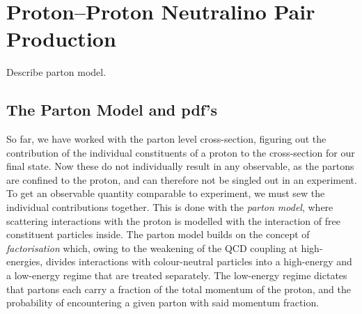 \documentclass[../main.tex]{subfiles}
\begin{document}
\chapter{Proton--Proton Neutralino Pair Production}

\begin{TODO}
  \item Describe parton model.
\end{TODO}

\section{The Parton Model and pdf's}
So far, we have worked with the parton level cross-section, figuring out the contribution of the individual constituents of a proton to the cross-section for our final state.
Now these do not individually result in any observable, as the partons are confined to the proton, and can therefore not be singled out in an experiment.
To get an observable quantity comparable to experiment, we must sew the individual contributions together.
This is done with the \emph{parton model}, where scattering interactions with the proton is modelled with the interaction of free constituent particles inside.
The parton model builds on the concept of \emph{factorisation} which, owing to the weakening of the QCD coupling at high-energies, divides interactions with colour-neutral particles into a high-energy and a low-energy regime that are treated separately.
The low-energy regime dictates that partons each carry a fraction of the total momentum of the proton, and the probability of encountering a given parton with said momentum fraction.
\end{document}
